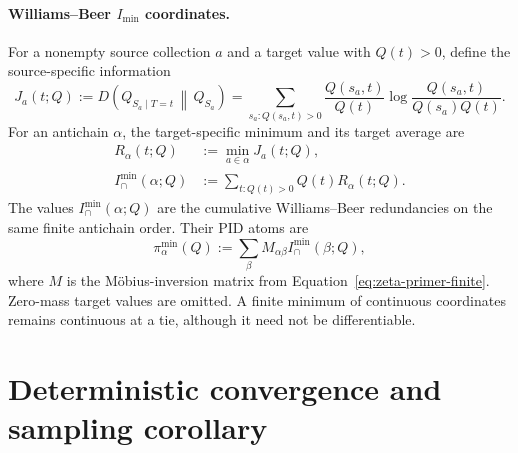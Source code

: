 \documentclass[11pt]{article}
\theoremstyle{definition}
\newcommand{\imin}{I_{\min}}
\begin{document}
\paragraph{Williams--Beer \texorpdfstring{$\imin$}{I-min} coordinates.}
For a nonempty source collection $a$ and a target value with $Q(t)>0$, define the
source-specific information
\begin{equation}\label{eq:ispec}
  J_a(t;Q)
  :=D\!\left(Q_{S_a\mid T=t}\,\middle\|\,Q_{S_a}\right)
  =\sum_{s_a:Q(s_a,t)>0}
    \frac{Q(s_a,t)}{Q(t)}
    \log\frac{Q(s_a,t)}{Q(s_a)Q(t)}.
\end{equation}
For an antichain $\alpha$, the target-specific minimum and its target average are
\begin{align}
  R_\alpha(t;Q)
    &:=\min_{a\in\alpha}J_a(t;Q), \\
  I^{\min}_{\cap}(\alpha;Q)
    &:=\sum_{t:Q(t)>0}Q(t)R_\alpha(t;Q).
\end{align}
The values $I^{\min}_{\cap}(\alpha;Q)$ are the cumulative Williams--Beer redundancies on the same
finite antichain order.  Their PID atoms are
\begin{equation}
  \pi^{\min}_\alpha(Q)
  :=\sum_\beta M_{\alpha\beta}I^{\min}_{\cap}(\beta;Q),
\end{equation}
where $M$ is the M{\"o}bius-inversion matrix from
Equation~\eqref{eq:zeta-primer-finite}.  Zero-mass target values are omitted.  A finite minimum of
continuous coordinates remains continuous at a tie, although it need not be differentiable.

\section{Deterministic convergence and sampling corollary}
\end{document}
